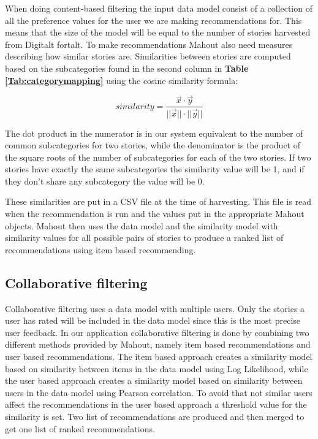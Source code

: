 When doing content-based filtering the input data model consist of a collection of all the preference values for the user we are making recommendations for. This means that the size of the model will be equal to the number of stories harvested from Digitalt fortalt. To make recommendations Mahout also need measures describing how similar stories are. Similarities between stories are computed based on the subcategories found in the second column in \textbf{Table \ref{Tab:categorymapping}} using the cosine similarity formula: 

\begin{equation}
similarity = \frac{\vec{x}\cdot\vec{y}}{||\vec{x}||\cdot||\vec{y}||}
\end{equation}

The dot product in the numerator is in our system equivalent to the number of common subcategories for two stories, while the denominator is the product of the square roots of the number of subcategories for each of the two stories. If two stories have exactly the same subcategories the similarity value will be 1, and if they don't share any subcategory the value will be 0. \newline

These similarities are put in a CSV file at the time of harvesting. This file is read when the recommendation is run and the values put in the appropriate Mahout objects. Mahout then uses the data model and the similarity model with similarity values for all possible pairs of stories to produce a ranked list of recommendations using item based recommending.


\subsection{Collaborative filtering}

Collaborative filtering uses a data model with multiple users. Only the stories a user has rated will be included in the data model since this is the most precise user feedback. In our application collaborative filtering is done by combining two different methods provided by Mahout, namely item based recommendations and user based recommendations. The item based approach creates a similarity model based on similarity between items in the data model using Log Likelihood, while the user based approach creates a similarity model based on similarity between users in the data model using Pearson correlation. To avoid that not similar users affect the recommendations in the user based approach a threshold value for the similarity is set. Two list of recommendations are produced and then merged to get one list of ranked recommendations.\newline

